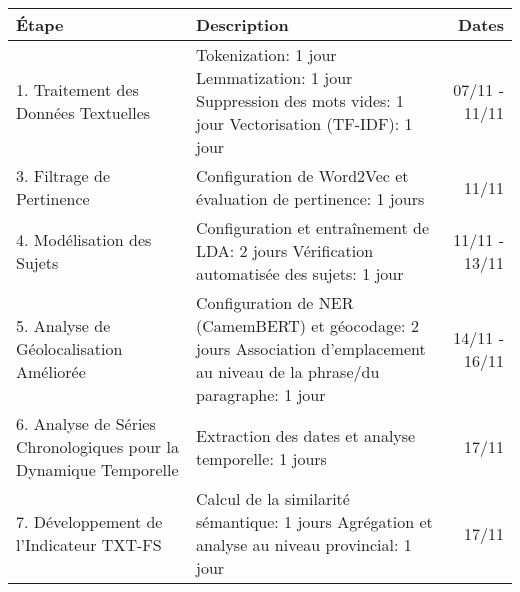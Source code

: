 \documentclass{article}
\begin{document}
\begin{tabularx}{\textwidth}{@{}lXr@{}}
\toprule
\textbf{Étape} & \textbf{Description} & \textbf{Dates} \\
\midrule
1. Traitement des Données Textuelles & 
Tokenization: 1 jour\newline
Lemmatization: 1 jour\newline
Suppression des mots vides: 1 jour\newline
Vectorisation (TF-IDF): 1 jour & 
07/11 - 11/11 \\
\midrule
3. Filtrage de Pertinence & 
Configuration de Word2Vec et évaluation de pertinence: 1 jours & 
11/11 \\
\midrule
4. Modélisation des Sujets & 
Configuration et entraînement de LDA: 2 jours\newline
Vérification automatisée des sujets: 1 jour & 
11/11 - 13/11 \\
\midrule
5. Analyse de Géolocalisation Améliorée & 
Configuration de NER (CamemBERT) et géocodage: 2 jours\newline
Association d'emplacement au niveau de la phrase/du paragraphe: 1 jour & 
14/11 - 16/11 \\
\midrule
6. Analyse de Séries Chronologiques pour la Dynamique Temporelle & 
Extraction des dates et analyse temporelle: 1 jours & 
17/11 \\
\midrule
7. Développement de l'Indicateur TXT-FS & 
Calcul de la similarité sémantique: 1 jours\newline
Agrégation et analyse au niveau provincial: 1 jour & 
17/11 \\
\bottomrule
\end{tabularx}
\end{document}
